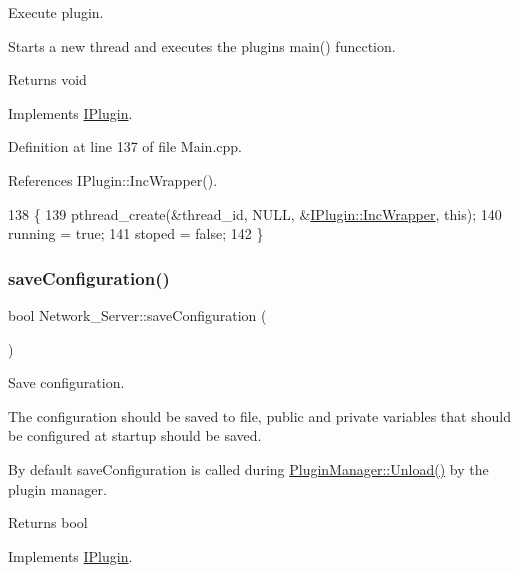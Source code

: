 Execute plugin. 

Starts a new thread and executes the plugins main() funcction. \begin{DoxyReturn}{Returns}
void 
\end{DoxyReturn}


Implements \hyperlink{class_i_plugin_a46b4ace767e77f9db9c9585e99c09039}{I\+Plugin}.



Definition at line 137 of file Main.\+cpp.



References I\+Plugin\+::\+Inc\+Wrapper().


\begin{DoxyCode}
138 \{
139     pthread\_create(&thread\_id, NULL, &\hyperlink{class_i_plugin_a62d22be2fdf66eb7f5c2f797f5f3d7f3}{IPlugin::IncWrapper}, \textcolor{keyword}{this});
140     running = \textcolor{keyword}{true};
141     stoped = \textcolor{keyword}{false};
142 \}
\end{DoxyCode}
\mbox{\label{class_network___server_a859ab976d5a6f1761f49e3e7abc6bb73}} 
\subsubsection{\texorpdfstring{save\+Configuration()}{saveConfiguration()}}
{\footnotesize\ttfamily bool Network\+\_\+\+Server\+::save\+Configuration (\begin{DoxyParamCaption}{ }\end{DoxyParamCaption})\hspace{0.3cm}{\ttfamily [virtual]}}



Save configuration. 

The configuration should be saved to file, public and private variables that should be configured at startup should be saved.

By default save\+Configuration is called during \hyperlink{class_plugin_manager_ab651a05d6fcb92562807e9f5ecc30855}{Plugin\+Manager\+::\+Unload()} by the plugin manager.

\begin{DoxyReturn}{Returns}
bool 
\end{DoxyReturn}


Implements \hyperlink{class_i_plugin_a79b5c42b1c7b08257a6110b2091039bc}{I\+Plugin}.



